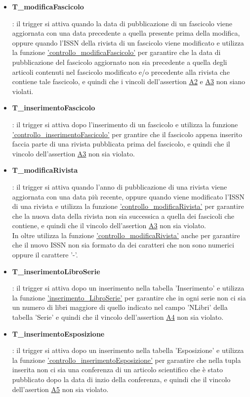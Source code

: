 \documentclass{article}
\begin{document}
\begin{itemize}
    \item \hypertarget{t6}{\textbf{T\_modificaFascicolo}}: il trigger si attiva quando la data di pubblicazione di un fascicolo viene aggiornata con una data precedente a quella presente prima della modifica, oppure quando l'ISSN della rivista di un fascicolo viene modificato e utilizza la funzione \hyperlink{f6}{'controllo\_modificaFascicolo'} per garantire che la data di pubblicazione del fascicolo aggiornato non sia precedente a quella degli articoli contenuti nel fascicolo modificato e/o precedente alla rivista che contiene tale fascicolo, e quindi che i vincoli dell'assertion \hyperlink{assertion2}{A2} e \hyperlink{assertion2}{A3} non siano violati.

    \item \hypertarget{t7}{\textbf{T\_inserimentoFascicolo}}: il trigger si attiva dopo l'inserimento di un fascicolo e utilizza la funzione \hyperlink{f7}{'controllo\_inserimentoFascicolo'} per grantire che il fascicolo appena inserito faccia parte di una rivista pubblicata prima del fascicolo, e quindi che il vincolo dell'assertion \hyperlink{assertion3}{A3} non sia violato.

    \item \hypertarget{t9}{\textbf{T\_modificaRivista}}: il trigger si attiva quando l'anno di pubblicazione di una rivista viene aggiornata con una data più recente, oppure quando viene modificato l'ISSN di una rivista e utilizza la funzione \hyperlink{f9}{'controllo\_modificaRivista'} per garantire che la nuova data della rivista non sia successica a quella dei fascicoli che contiene, e quindi che il vincolo dell'asertion \hyperlink{assertion3}{A3} non sia violato.\\
     In oltre utilizza la funzione \hyperlink{f9}{'controllo\_modificaRivista'} anche per garantire che il nuovo ISSN non sia formato da dei caratteri che non sono numerici oppure il carattere '-'.

    \item \hypertarget{t10}{\textbf{T\_inserimentoLibroSerie}}: il trigger si attiva dopo un inserimento nella tabella 'Inserimento' e utilizza la funzione \hyperlink{f10}{'inserimento\_LibroSerie'} per garantire che in ogni serie non ci sia un numero di libri maggiore di quello indicato nel campo 'NLibri' della tabella 'Serie' e quindi che il vincolo dell'assertion \hyperlink{assertion4}{A4} non sia violato.

   \item \hypertarget{t11}{\textbf{T\_inserimentoEsposizione}}: il trigger si attiva dopo un inserimento nella tabella 'Esposizione' e utilizza la funzione \hyperlink{f11}{'controllo\_inserimentoEsposizione'} per garantire che nella tupla inserita non ci sia una conferenza di un articolo scientifico che è stato pubblicato dopo la data di inzio della conferenza, e quindi che il vincolo dell'asertion  \hyperlink{assertion5}{A5} non sia violato.


\end{itemize}
\end{document}

